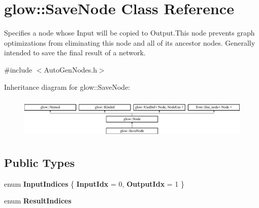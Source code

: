 \hypertarget{classglow_1_1_save_node}{}\section{glow\+:\+:Save\+Node Class Reference}
\label{classglow_1_1_save_node}


Specifies a node whose Input will be copied to Output.\+This node prevents graph optimizations from eliminating this node and all of its ancestor nodes. Generally intended to save the final result of a network.  




{\ttfamily \#include $<$Auto\+Gen\+Nodes.\+h$>$}

Inheritance diagram for glow\+:\+:Save\+Node\+:\begin{figure}[H]
\begin{center}
\leavevmode
\includegraphics[height=2.028986cm]{classglow_1_1_save_node}
\end{center}
\end{figure}
\subsection*{Public Types}
\begin{DoxyCompactItemize}
\item 
\mbox{\label{classglow_1_1_save_node_a356913a60cd7c27f1e56c2c474ef40d5}} 
enum {\bfseries Input\+Indices} \{ {\bfseries Input\+Idx} = 0, 
{\bfseries Output\+Idx} = 1
 \}
\item 
\mbox{\label{classglow_1_1_save_node_aadf41fffea2920b973068dd346e01f15}} 
enum {\bfseries Result\+Indices} 
\end{DoxyCompactItemize}
